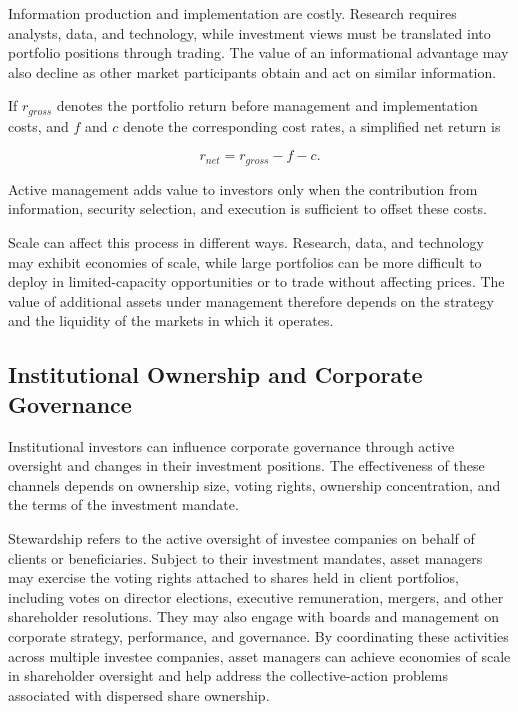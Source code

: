Information production and implementation are costly. Research requires analysts, data, and technology, while investment views must be translated into portfolio positions through trading. The value of an informational advantage may also decline as other market participants obtain and act on similar information.

If $r_{gross}$ denotes the portfolio return before management and implementation costs, and $f$ and $c$ denote the corresponding cost rates, a simplified net return is

\begin{equation}
r_{net}=r_{gross}-f-c.
\label{eq:ch14-net-portfolio-return}
\end{equation}

Active management adds value to investors only when the contribution from information, security selection, and execution is sufficient to offset these costs.

Scale can affect this process in different ways. Research, data, and technology may exhibit economies of scale, while large portfolios can be more difficult to deploy in limited-capacity opportunities or to trade without affecting prices. The value of additional assets under management therefore depends on the strategy and the liquidity of the markets in which it operates.

\subsection{Institutional Ownership and Corporate Governance}

Institutional investors can influence corporate governance
through active oversight and changes in their investment
positions. The effectiveness of these channels depends on
ownership size, voting rights, ownership concentration, and
the terms of the investment mandate.

Stewardship refers to the active oversight of investee
companies on behalf of clients or beneficiaries. Subject to
their investment mandates, asset managers may exercise the
voting rights attached to shares held in client portfolios,
including votes on director elections, executive remuneration, mergers, and other shareholder resolutions. They may also engage with boards and management on corporate strategy, performance, and governance. By coordinating these activities across multiple investee companies, asset managers can achieve economies of scale in shareholder oversight and help address the collective-action problems associated with dispersed share ownership.


